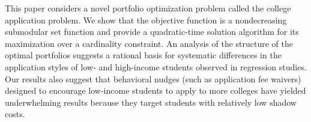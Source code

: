 This paper considers a novel portfolio optimization problem called the college application
problem. We show that the objective function is a nondecreasing submodular set function
and provide a quadratic-time solution algorithm for its maximization over a cardinality
constraint. An analysis of the structure of the optimal portfolios suggests a rational basis
for systematic differences in the application styles of low- and high-income students observed
in regression studies. Our results also suggest that behavioral nudges (such as application
fee waivers) designed to encourage low-income students to apply to more colleges have yielded
underwhelming results because they target students with relatively low shadow costs.
